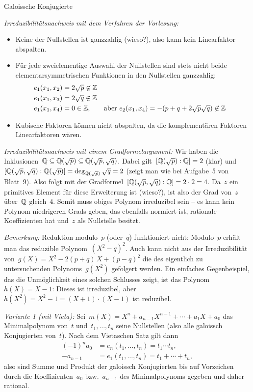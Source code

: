 \documentclass{algblatt}
\begin{document}
\begin{aufgabe}{Galoissche Konjugierte}
\begin{loesungE}
\emph{Irreduzibilitätsnachweis mit dem Verfahren der Vorlesung:}
\begin{itemize}
\item Keine der Nullstellen ist ganzzahlig (wieso?), also
kann kein Linearfaktor abspalten.

\item Für jede zweielementige Auswahl der Nullstellen
sind stets nicht beide elementarsymmetrischen Funktionen in den Nullstellen
ganzzahlig:
\begin{align*}
  e_1(x_1,x_2) &= 2\sqrt{p} \not\in \mathbb{Z} \\
  e_1(x_1,x_3) &= 2\sqrt{q} \not\in \mathbb{Z} \\
  e_1(x_1,x_4) &= 0 \in \mathbb{Z}, & \text{aber } e_2(x_1,x_4) &= -(p+q+2\sqrt{p}\sqrt{q}) \not\in \mathbb{Z}
\end{align*}

\item Kubische Faktoren können nicht abspalten, da die
komplementären Faktoren Linearfaktoren wären.
\end{itemize}

\emph{Irreduzibilitätsnachweis mit einem Gradformelargument:}
Wir haben die Inklusionen~$\mathbb{Q} \subseteq \mathbb{Q}(\sqrt{p}) \subseteq
\mathbb{Q}(\sqrt{p},\sqrt{q})$. Dabei gilt~$[\mathbb{Q}(\sqrt{p}):\mathbb{Q}] = 2$ (klar)
und~$[\mathbb{Q}(\sqrt{p},\sqrt{q}):\mathbb{Q}(\sqrt{p})] = \deg_{\mathbb{Q}(\sqrt{p})}
\sqrt{q} = 2$ (zeigt man wie bei Aufgabe~5 von Blatt~9). Also folgt mit der
Gradformel~$[\mathbb{Q}(\sqrt{p},\sqrt{q}):\mathbb{Q}] = 2 \cdot 2 = 4$.
Da~$z$ ein primitives Element für diese Erweiterung ist
(wieso?), ist also der Grad von~$z$ über~$\mathbb{Q}$ gleich~$4$. Somit muss obiges
Polynom irreduzibel sein -- es kann kein Polynom niedrigeren Grads geben, das
ebenfalls normiert ist, rationale Koeffizienten hat und~$z$ als Nullstelle
besitzt.

\emph{Bemerkung:} Reduktion modulo~$p$ (oder~$q$) funktioniert nicht:
Modulo~$p$ erhält man das reduzible Polynom~$(X^2 - q)^2$. Auch kann nicht aus
der Irreduzibilität von~$g(X) = X^2 - 2(p+q)\,X + (p-q)^2$ die des eigentlich
zu untersuchenden Polynoms~$g(X^2)$ gefolgert werden. Ein einfaches
Gegenbeispiel, das die Unmöglichkeit eines solchen Schlusses zeigt, ist das
Polynom~$h(X) = X - 1$: Dieses ist irreduzibel, aber~$h(X^2) = X^2 - 1 = (X+1)
\cdot (X-1)$ ist reduzibel.

\item \emph{Variante 1 (mit Vieta):}
Sei~$m(X) = X^n + a_{n-1}X^{n-1} + \cdots + a_1 X + a_0$ das
Minimalpolynom von~$t$ und~$t_1,\ldots,t_n$ seine Nullstellen (also alle
galoissch Konjugierten von~$t$). Nach dem Vietaschen Satz gilt dann
\begin{align*}
  (-1)^n a_0 &= e_n(t_1,\ldots,t_n) = t_1 \cdots t_n, \\
  -a_{n-1} &= e_1(t_1,\ldots,t_n) = t_1 + \cdots + t_n,
\end{align*}
also sind Summe und Produkt der galoissch Konjugierten bis auf Vorzeichen durch
die Koeffizienten~$a_0$ bzw.~$a_{n-1}$ des Minimalpolynoms gegeben und daher
rational.


\end{loesungE}
\end{aufgabe}
\end{document}
